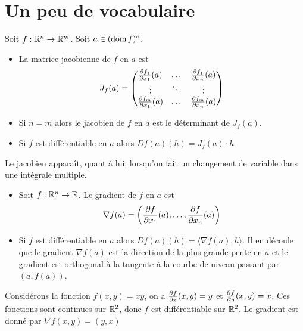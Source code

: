 \section{Un peu de vocabulaire}
\begin{definition}
   Soit $f : \mathbb{R}^n\to\mathbb{R}^m$. Soit $a\in(\operatorname{dom} f)^\circ$. \begin{itemize}
       \item La matrice jacobienne de $f$ en $a$ est 
   \begin{equation*}
       J_f(a)=
       \begin{pmatrix}
           \frac{\partial f_1}{\partial x_1}(a)&\dots& \frac{\partial f_1}{\partial x_n}(a)\\
           \vdots& \ddots& \vdots\\
           \frac{\partial f_m}{\partial x_1}(a)&\dots&\frac{\partial f_m}{\partial x_n}(a)
       \end{pmatrix}
   \end{equation*}
   \item Si $n=m$ alors le jacobien de $f$ en $a$ est le déterminant de $J_f(a)$. 
   \item Si $f$ est différentiable en $a$ alors $Df(a)(h) = J_f(a)\cdot h$
   \end{itemize}
   Le jacobien apparaît, quant à lui, lorsqu'on fait un changement de variable dans une intégrale multiple.
\end{definition}
\begin{definition}
\begin{itemize}
    \item  Soit $f:\mathbb{R}^n\to\mathbb{R}$. Le gradient de $f$ en $a$ est $$\nabla f(a) = \left(\frac{\partial f}{\partial x_1}(a),\dotsc, \frac{\partial f}{\partial x_n}(a)\right)$$
    \item Si $f$ est différentiable en $a$ alors $Df(a)(h) = \langle \nabla f(a), h\rangle$. Il en découle que le gradient $\nabla f(a)$ est la direction de la plus grande pente en $a$ et le gradient est orthogonal à la tangente à la courbe de niveau passant par $(a,f(a))$.
\end{itemize}
   
\end{definition}
\begin{exemple}
    Considérons la fonction $f(x,y)=xy$, on a $\frac{\partial f}{\partial x}(x,y)=y$ et $\frac{\partial f}{\partial y}(x,y)=x$. Ces fonctions sont continues sur $\mathbb{R}^2$, donc $f$ est différentiable sur $\mathbb{R}^2$. Le gradient est donné par $\nabla f(x,y) = (y,x)$
\end{exemple}
